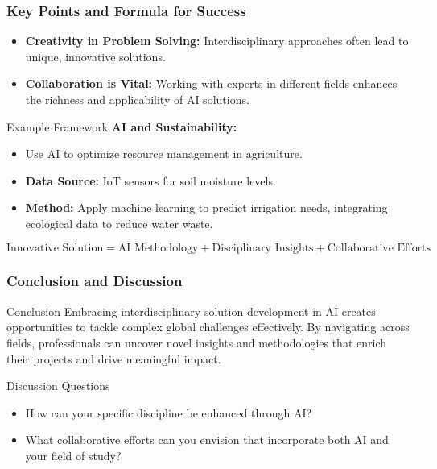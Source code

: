 \documentclass[aspectratio=169]{beamer}
\begin{document}
\begin{frame}[fragile]
    \frametitle{Key Points and Formula for Success}
    \begin{itemize}
        \item \textbf{Creativity in Problem Solving:} Interdisciplinary approaches often lead to unique, innovative solutions.
        \item \textbf{Collaboration is Vital:} Working with experts in different fields enhances the richness and applicability of AI solutions.
    \end{itemize}
    
    \begin{block}{Example Framework}
        \textbf{AI and Sustainability:} 
        \begin{itemize}
            \item Use AI to optimize resource management in agriculture.
            \item \textbf{Data Source:} IoT sensors for soil moisture levels.
            \item \textbf{Method:} Apply machine learning to predict irrigation needs, integrating ecological data to reduce water waste.
        \end{itemize}
    \end{block}
    
    \begin{equation}
    \text{Innovative Solution} = \text{AI Methodology} + \text{Disciplinary Insights} + \text{Collaborative Efforts}
    \end{equation}
\end{frame}

\begin{frame}[fragile]
    \frametitle{Conclusion and Discussion}
    \begin{block}{Conclusion}
        Embracing interdisciplinary solution development in AI creates opportunities to tackle complex global challenges effectively. By navigating across fields, professionals can uncover novel insights and methodologies that enrich their projects and drive meaningful impact.
    \end{block}

    \begin{block}{Discussion Questions}
        \begin{itemize}
            \item How can your specific discipline be enhanced through AI?
            \item What collaborative efforts can you envision that incorporate both AI and your field of study?
        \end{itemize}
    \end{block}
\end{frame}
\end{document}
